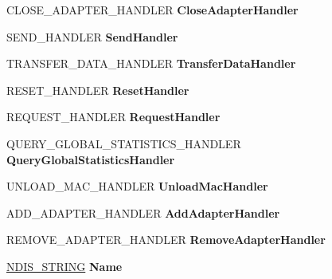 \begin{DoxyCompactItemize}
C\+L\+O\+S\+E\+\_\+\+A\+D\+A\+P\+T\+E\+R\+\_\+\+H\+A\+N\+D\+L\+ER {\bfseries Close\+Adapter\+Handler}
\item 
\mbox{\label{struct___n_d_i_s___m_a_c___c_h_a_r_a_c_t_e_r_i_s_t_i_c_s_af71ebd3b170c046c2bdc03c55a67cdc7}} 
S\+E\+N\+D\+\_\+\+H\+A\+N\+D\+L\+ER {\bfseries Send\+Handler}
\item 
\mbox{\label{struct___n_d_i_s___m_a_c___c_h_a_r_a_c_t_e_r_i_s_t_i_c_s_a8a7fe7dd91729442cca6501be44497bd}} 
T\+R\+A\+N\+S\+F\+E\+R\+\_\+\+D\+A\+T\+A\+\_\+\+H\+A\+N\+D\+L\+ER {\bfseries Transfer\+Data\+Handler}
\item 
\mbox{\label{struct___n_d_i_s___m_a_c___c_h_a_r_a_c_t_e_r_i_s_t_i_c_s_aed5774b7d7299cfbd09f18c70472b64e}} 
R\+E\+S\+E\+T\+\_\+\+H\+A\+N\+D\+L\+ER {\bfseries Reset\+Handler}
\item 
\mbox{\label{struct___n_d_i_s___m_a_c___c_h_a_r_a_c_t_e_r_i_s_t_i_c_s_a454ca97836f9c148d811bc199d08fa6b}} 
R\+E\+Q\+U\+E\+S\+T\+\_\+\+H\+A\+N\+D\+L\+ER {\bfseries Request\+Handler}
\item 
\mbox{\label{struct___n_d_i_s___m_a_c___c_h_a_r_a_c_t_e_r_i_s_t_i_c_s_af93419d30487187bf9155111cc551d5a}} 
Q\+U\+E\+R\+Y\+\_\+\+G\+L\+O\+B\+A\+L\+\_\+\+S\+T\+A\+T\+I\+S\+T\+I\+C\+S\+\_\+\+H\+A\+N\+D\+L\+ER {\bfseries Query\+Global\+Statistics\+Handler}
\item 
\mbox{\label{struct___n_d_i_s___m_a_c___c_h_a_r_a_c_t_e_r_i_s_t_i_c_s_a5173e483c918a20d61a095235b9d7953}} 
U\+N\+L\+O\+A\+D\+\_\+\+M\+A\+C\+\_\+\+H\+A\+N\+D\+L\+ER {\bfseries Unload\+Mac\+Handler}
\item 
\mbox{\label{struct___n_d_i_s___m_a_c___c_h_a_r_a_c_t_e_r_i_s_t_i_c_s_ace2d06c7e380cfb746b10f667d0861ed}} 
A\+D\+D\+\_\+\+A\+D\+A\+P\+T\+E\+R\+\_\+\+H\+A\+N\+D\+L\+ER {\bfseries Add\+Adapter\+Handler}
\item 
\mbox{\label{struct___n_d_i_s___m_a_c___c_h_a_r_a_c_t_e_r_i_s_t_i_c_s_a72b1b16dfd8584c6f6e0298ef69cc5fd}} 
R\+E\+M\+O\+V\+E\+\_\+\+A\+D\+A\+P\+T\+E\+R\+\_\+\+H\+A\+N\+D\+L\+ER {\bfseries Remove\+Adapter\+Handler}
\item 
\mbox{\label{struct___n_d_i_s___m_a_c___c_h_a_r_a_c_t_e_r_i_s_t_i_c_s_a582956111ad330130f228867afceb1a2}} 
\hyperlink{struct___u_n_i_c_o_d_e___s_t_r_i_n_g}{N\+D\+I\+S\+\_\+\+S\+T\+R\+I\+NG} {\bfseries Name}
\end{DoxyCompactItemize}


